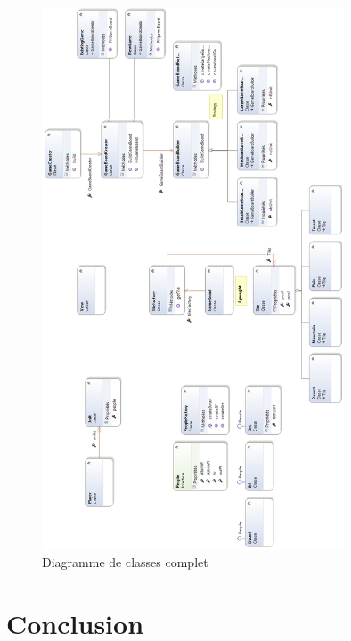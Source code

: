 \documentclass[a4paper]{article}
\begin{document}
\begin{figure}[ht]
\centering
	\includegraphics[width=0.8\textwidth, height=0.74\textheight]{../Schemas/class_global.png}
		\caption{Diagramme de classes complet}
		\label{fig:class_global}
\end{figure}

\clearpage
\section{Conclusion}
\newpage
\listoffigures
\end{document}
